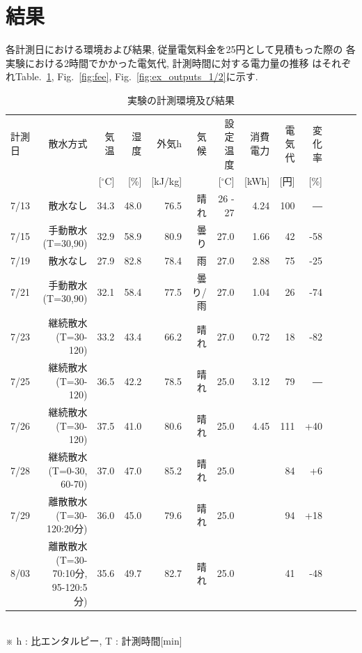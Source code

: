 \documentclass[a4j,fleqn,dvipdfmx,uplatex]{jsarticle}
\newcommand{\figref}[1]{Fig.\ \ref{#1}}
\newcommand{\tableref}[1]{Table.\ \ref{#1}}
\begin{document}
\section{結果}\label{sec3}
各計測日における環境および結果, 従量電気料金を25円として見積もった際の
各実験における2時間でかかった電気代, 計測時間に対する電力量の推移
はそれぞれ\tableref{table:ex}, \figref{fig:fee}, \figref{fig:ex_outputs_1/2}に示す. 

\begin{table}[htb]
  \caption{実験の計測環境及び結果}
  \label{table:ex}
  \centering
  \begin{tabular}{lrrrrrrrrrrrr}
    計測日 & 散水方式 & 気温 & 湿度 & 外気h & 気候 & 設定温度 & 消費電力 & 電気代 & 変化率 \\[-1.5mm]
     & & \small [$^\circ$C] & \small [\%] & \small [kJ/kg] & & \small [$^\circ$C] & \small [kWh] & \small [円] & \small [\%]\\
    \hline \hline
    7/13 & 散水なし & 34.3 & 48.0 & 76.5 & 晴れ & 26 - 27 & 4.24 & 100 & ― \\
    7/15 & 手動散水(T=30,90) & 32.9 & 58.9 & 80.9 & 曇り & 27.0 & 1.66 & 42 & -58 \\
    7/19 & 散水なし & 27.9 & 82.8 & 78.4 & 雨 & 27.0 & 2.88 & 75 & -25 \\
    7/21 & 手動散水(T=30,90) & 32.1 & 58.4 & 77.5 & 曇り/雨 & 27.0 & 1.04 & 26 & -74 \\[3mm]
    7/23 & 継続散水(T=30-120) & 33.2 & 43.4 & 66.2 & 晴れ & 27.0 & 0.72 & 18 & -82 \\
    7/25 & 継続散水(T=30-120) & 36.5 & 42.2 & 78.5 & 晴れ & 25.0 & 3.12 & 79 & ― \\
    7/26 & 継続散水(T=30-120) & 37.5 & 41.0 & 80.6 & 晴れ & 25.0 & 4.45 & 111 & +40 \\
    7/28 & 継続散水(T=0-30, 60-70) & 37.0 & 47.0 & 85.2 & 晴れ & 25.0 & & 84 & +6\\
    7/29 & 離散散水(T=30-120:20分) & 36.0 & 45.0 & 79.6 & 晴れ & 25.0 &  & 94 & +18 \\
    8/03  & \footnotesize 離散散水(T=30-70:10分, 95-120:5分) & 35.6 & 49.7 & 82.7 & 晴れ & 25.0 &  & 41 & -48 \\
    \hline
  \end{tabular}\\
  \small ※ h : 比エンタルピー, T : 計測時間[min]
\end{table}
\end{document}
